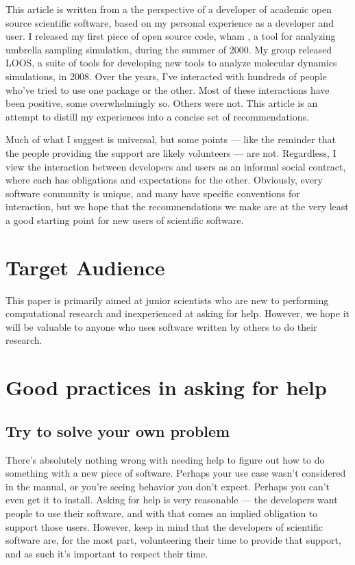 \documentclass[9pt,training,ASAPversion]{livecoms}
\begin{document}
This article is written from a the perspective of a developer of academic
open source scientific software, based on my personal experience as a developer
and user. I released my first piece of open source code, wham \cite{WHAM}, a
tool for analyzing umbrella sampling simulation,  during the summer of 2000.  My
group released LOOS\cite{Grossfield-2009, LOOS-JCC}, a suite of tools for
developing new tools to analyze molecular dynamics simulations, in 2008. Over
the years, I've interacted with hundreds of people who've tried to use one
package or the other. Most of these interactions have been positive, some
overwhelmingly so. Others were not. This article is an attempt to distill my
experiences into a concise set of recommendations.

Much of what I suggest is universal, but some points --- like the
reminder that the people providing the support are likely volunteers --- are
not.  Regardless, I view the interaction between developers and users as an
informal social contract, where each has obligations and expectations for the
other. Obviously, every software community is unique, and many have specific
conventions for interaction, but we hope that the recommendations we make are at
the very least a good starting point for new users of scientific software.



\section{Target Audience}

This paper is primarily aimed at junior scientists who are new to performing
computational research and inexperienced at asking for help. However, we hope it
will be valuable to anyone who uses software written by others to do their
research.

\section{Good practices in asking for help}

\subsection{Try to solve your own problem}
\label{ss:yourself}

There's absolutely nothing wrong with needing help to figure out how to do
something with a new piece of software. Perhaps your use case wasn't considered
in the manual, or you're seeing behavior you don't expect. Perhaps you can't
even get it to install. Asking for help is very reasonable --- the developers
want people to use their software, and with that comes an implied obligation to
support those users. However, keep in mind that the developers of scientific
software are, for the most part, volunteering their time to provide that
support, and as such it's important to respect their time.
\end{document}
